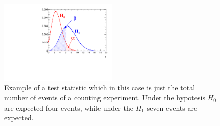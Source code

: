 \begin{figure}[tp]
  \centering
 \includegraphics[width=0.5\textwidth]{figure/test_stat.pdf}
  \caption{Example of a test statistic which in this case is just the total number of events of a counting experiment.
	Under the hypotesis $H_0$ are expected four events, while under the $H_1$ seven  events are expected.} 
\label{fig:teststat}
\end{figure}

